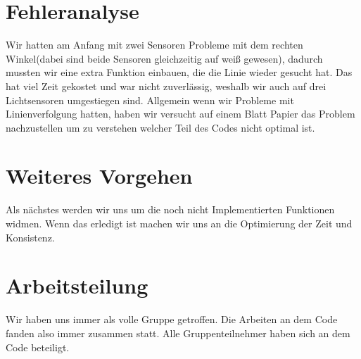 \documentclass[11pt]{article}
\begin{document}
\section{Fehleranalyse}
Wir hatten am Anfang mit zwei Sensoren Probleme mit dem rechten Winkel(dabei sind beide Sensoren gleichzeitig auf weiß gewesen), dadurch mussten wir eine extra Funktion einbauen, die die Linie wieder gesucht hat. Das hat viel Zeit gekostet und war nicht zuverlässig, weshalb wir auch auf drei Lichtsensoren umgestiegen sind. Allgemein wenn wir Probleme mit Linienverfolgung hatten, haben wir versucht auf einem Blatt Papier das Problem nachzustellen um zu verstehen welcher Teil des Codes nicht optimal ist.

\section{Weiteres Vorgehen}
Als nächstes werden wir uns um die noch nicht Implementierten Funktionen widmen. Wenn das erledigt ist machen wir uns an die Optimierung der Zeit und Konsistenz.

\section{Arbeitsteilung}
Wir haben uns immer als volle Gruppe getroffen. Die Arbeiten an dem Code fanden also immer zusammen statt. Alle Gruppenteilnehmer haben sich an dem Code beteiligt.
\end{document}
